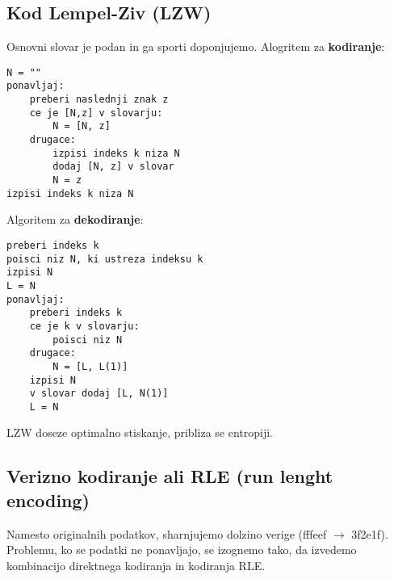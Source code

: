 \documentclass{article}
\begin{document}
\begin{multicols}{2}
	\subsection{Kod Lempel-Ziv (LZW)}
	Osnovni slovar je podan in ga sporti doponjujemo. Alogritem za \textbf{kodiranje}:
	\begin{verbatim}
N = ""
ponavljaj:
    preberi naslednji znak z
    ce je [N,z] v slovarju:
        N = [N, z]
    drugace:
        izpisi indeks k niza N
        dodaj [N, z] v slovar
        N = z
izpisi indeks k niza N
\end{verbatim}
	Algoritem za \textbf{dekodiranje}:
	\begin{verbatim}
preberi indeks k
poisci niz N, ki ustreza indeksu k
izpisi N
L = N
ponavljaj:
    preberi indeks k
    ce je k v slovarju:
        poisci niz N
    drugace:
        N = [L, L(1)]
    izpisi N
    v slovar dodaj [L, N(1)]
    L = N
\end{verbatim}
	LZW doseze optimalno stiskanje, pribliza se entropiji. %

	\subsection{Verizno kodiranje ali RLE (run lenght encoding)}
	Namesto originalnih podatkov, sharnjujemo dolzino verige (fffeef $\rightarrow$ 3f2e1f).
	Problemu, ko se podatki ne ponavljajo, se izognemo tako, da izvedemo kombinacijo direktnega kodiranja
	in kodiranja RLE. %



\end{multicols}
\end{document}
